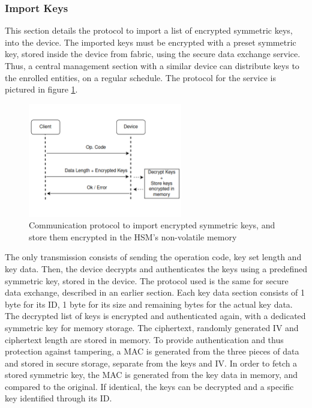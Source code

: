 \subsubsection{Import Keys}\label{chap:arch:services:new-comms:import}

This section details the protocol to import a list of encrypted symmetric keys, into the device.
The imported keys must be encrypted with a preset symmetric key, stored inside the device from fabric, using the secure data exchange service. Thus, a central management section with a similar device can distribute keys to the enrolled entities, on a regular schedule.
The protocol for the service is pictured in figure \ref{fig:protocol:import-keys}.

\begin{figure}[h!]
	\centering
	\includegraphics[width=0.60\textwidth]{./Images/import-keys.png}
	\caption{Communication protocol to import encrypted symmetric keys, and store them encrypted in the HSM's non-volatile memory}
	\label{fig:protocol:import-keys}
\end{figure}

The only transmission consists of sending the operation code, key set length and key data. Then, the device decrypts and authenticates the keys using a predefined symmetric key, stored in the device. The protocol used is the same for secure data exchange, described in an earlier section.
Each key data section consists of 1 byte for its ID, 1 byte for its size and remaining bytes for the actual key data.
The decrypted list of keys is encrypted and authenticated again, with a dedicated symmetric key for memory storage. The ciphertext, randomly generated IV and ciphertext length are stored in memory. To provide authentication and thus protection against tampering, a \ac{MAC} is generated from the three pieces of data and stored in secure storage, separate from the keys and IV.
In order to fetch a stored symmetric key, the \ac{MAC} is generated from the key data in memory, and compared to the original. If identical, the keys can be decrypted and a specific key identified through its ID.

